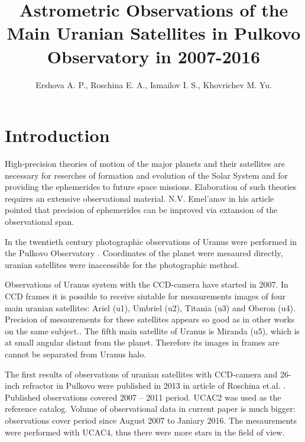 \documentclass[]{article}
\title{Astrometric Observations of the Main Uranian Satellites in Pulkovo Observatory in 2007-2016}
\author{Ershova A. P., Roschina E. A., Ismailov I. S., Khovrichev M. Yu.}
\begin{document}
\maketitle

\begin{abstract}

\end{abstract}

\section{Introduction}
High-precision theories of motion of the major planets and their satellites  are necessary for reserches of formation and evolution of the Solar System and for providing the ephemerides to future space missions. Elaboration of such theories requires an extensive observational material. N.V. Emel'anov in his article \cite{4} pointed that precision of ephemerides can be improved via extansion of the observational span.\par

In the twentieth century photographic observations of Uranus were performed in the Pulkovo Observatory \cite{8}. Coordinates of the planet were mesaured directly, uranian satellites were inaccessible for the photographic method.\par

Observations of Uranus system with the CCD-camera have started in 2007. In CCD frames it is possible to receive siutable for mesaurements images of four main uranian satellites: Ariel (u1), Umbriel (u2), Titania (u3) and Oberon (u4). Precision of mesaurements for these satellites appears so good as in other works on the same subject.\cite{2, 7}. The fifth main satellite of Uranus is Miranda (u5), which is at small angular distant from the planet. Therefore its images in frames are cannot be separated from Uranus halo.\par

The first results of observations of uranian satellites with CCD-camera and 26-inch refractor in Pulkovo were published in 2013 in article of Roschina et.al. \cite{1}. Published observations covered 2007 -- 2011 period. UCAC2 was used as the reference catalog. Volume of observational data in current paper is much bigger: observations cover period since August 2007 to Janiary 2016. The mesaurements were performed with UCAC4, thus there were more stars in the field of view.
\end{document}
